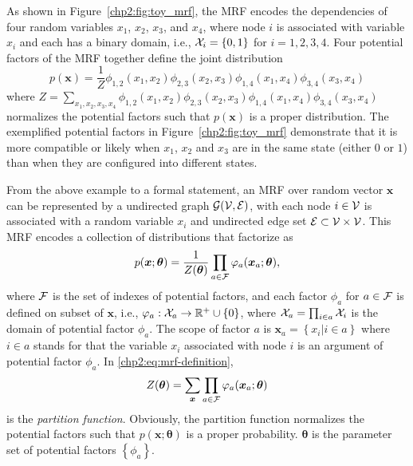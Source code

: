 \begin{example}\label{chpt2:mrf-3node-example}
  As shown in Figure~\ref{chp2:fig:toy_mrf}, the MRF encodes the dependencies of four random variables $x_1$, $x_2$, $x_3$, and $x_4$, where node $i$ is associated with variable $x_i$ and each has a binary domain, i.e., $\mathcal{X}_i = \{0,1\}$ for $i =1, 2, 3, 4$. Four potential factors of the MRF together define the joint distribution
  \begin{equation*}
    p(\bm{x}) = \frac{1}{Z} \phi_{1,2}(x_1, x_2) \phi_{2,3}(x_2, x_3) \phi_{1,4}(x_1, x_4)\phi_{3,4}(x_3, x_4)
  \end{equation*}
  where $Z = \sum_{x_1, x_2, x_3, x_4}\phi_{1,2}(x_1, x_2) \phi_{2,3}(x_2, x_3) \phi_{1,4}(x_1, x_4)\phi_{3,4}(x_3, x_4)$ normalizes the potential factors such that $p(\bm{x})$ is a proper distribution. The exemplified potential factors in Figure~\ref{chp2:fig:toy_mrf} demonstrate that it is more compatible or likely when $x_1$, $x_2$ and $x_3$ are in the same state (either $0$ or $1$) than when they are configured into different states.
\end{example}

From the above example to a formal statement, an MRF over random vector $\bm{x}$ can be represented by a undirected graph $\mathcal{G}(\mathcal{V}, \mathcal{E})$, with each node $i \in \mathcal{V}$ is associated with a random variable $x_i$ and undirected edge set $\mathcal{E} \subset \mathcal{V} \times \mathcal{V}$. This MRF encodes a collection of distributions that factorize as
\begin{equation}\label{chp2:eq:mrf-definition}
  p(\bm{x};\bm{\theta}) = \frac{1}{Z(\bm{\theta})} \prod_{a \in \mathcal{F}} \varphi_{a}(\bm{x}_{a};\bm{\theta}),
\end{equation}
where $\mathcal{F}$ is the set of indexes of potential factors, and each factor $\phi_{a}$ for $a\in \mathcal{F}$ is defined on subset of $\bm{x}$, i.e., $\varphi_{a}: \mathcal{X}_{a} \rightarrow \mathbb{R}^{+} \cup \{0\}$, where $\mathcal{X}_{a} = \prod_{i\in a}\mathcal{X}_i$ is the domain of potential factor $\phi_{a}$. The scope of factor $a$ is $\bm{x}_{a} = \left\{ x_i| i\in a \right\}$ where $i \in a$ stands for that the variable $x_i$ associated with node $i$ is an argument of potential factor $\phi_{a}$. In \eqref{chp2:eq:mrf-definition},
\begin{equation}
  Z(\bm{\theta}) = \sum_{\bm{x}} \prod_{a \in \mathcal{F}} \varphi_{a}(\bm{x}_{a};\bm{\theta})
\end{equation}
is the \textit{partition function}. Obviously, the partition function normalizes the potential factors such that $p(\bm{x}; \bm{\theta})$ is a proper probability. $\bm{\theta}$ is the parameter set of potential factors $\left\{ \phi_a \right\}$.

